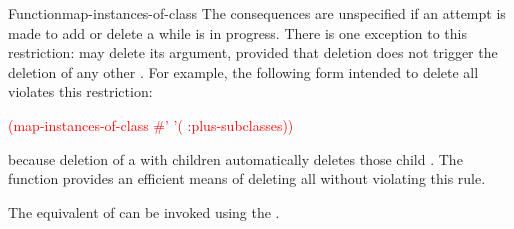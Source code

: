 \documentclass[10pt,twoside,english,pdftex]{article}
\begin{document}
\begin{functiondoc}{Function}{map-instances-of-class}
\fnnote
{}%
%
%
The consequences are unspecified if an attempt is made to add or delete a
 while  is in
progress.  There is one exception to this restriction: 
may delete its  argument, provided that deletion does not
trigger the deletion of any other .  For example, the
following form intended to delete all  violates this
restriction:
%
\W\supp
\begin{example}
   \textcolor{red}{(map-instances-of-class 
     #' 
     '( :plus-subclasses))}
\end{example}
%
because deletion of a  with children automatically
deletes those child .  The function
 provides an efficient
means of deleting all  without violating this rule.

\replnote 
%
%
%
The equivalent of 
can be invoked using the  .

\end{functiondoc}

\end{document}
